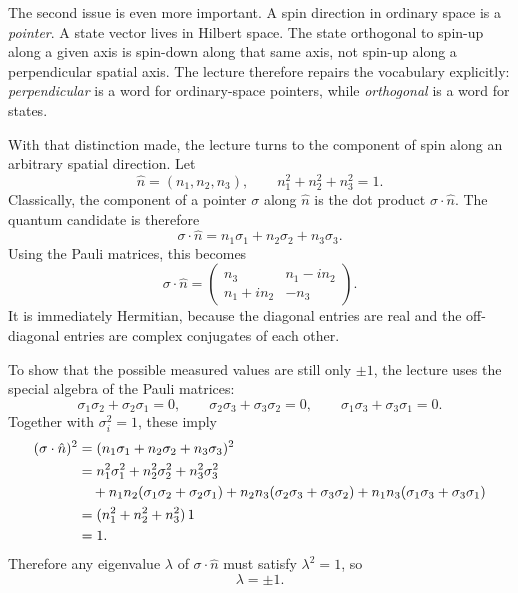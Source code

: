 The second issue is even more important. A spin direction in ordinary space is a \emph{pointer}. A state vector lives in Hilbert space. The state orthogonal to spin-up along a given axis is spin-down along that same axis, not spin-up along a perpendicular spatial axis. The lecture therefore repairs the vocabulary explicitly: \emph{perpendicular} is a word for ordinary-space pointers, while \emph{orthogonal} is a word for states.

With that distinction made, the lecture turns to the component of spin along an arbitrary spatial direction. Let
\begin{equation}
\hat n=(n_1,n_2,n_3),
\qquad
n_1^2+n_2^2+n_3^2=1.
\end{equation}
Classically, the component of a pointer \(\sigma\) along \(\hat n\) is the dot product \(\sigma\cdot \hat n\). The quantum candidate is therefore
\begin{equation}
\sigma\cdot \hat n=n_1\sigma_1+n_2\sigma_2+n_3\sigma_3.
\end{equation}
Using the Pauli matrices, this becomes
\begin{equation}
\sigma\cdot \hat n=
\begin{pmatrix}
n_3 & n_1-in_2\\
n_1+in_2 & -n_3
\end{pmatrix}.
\end{equation}
It is immediately Hermitian, because the diagonal entries are real and the off-diagonal entries are complex conjugates of each other.

To show that the possible measured values are still only \(\pm1\), the lecture uses the special algebra of the Pauli matrices:
\begin{equation}
\sigma_1\sigma_2+\sigma_2\sigma_1=0,
\qquad
\sigma_2\sigma_3+\sigma_3\sigma_2=0,
\qquad
\sigma_1\sigma_3+\sigma_3\sigma_1=0.
\end{equation}
Together with \(\sigma_i^2=1\), these imply
\begin{align}
(\sigma\cdot \hat n)^2
&=
(n_1\sigma_1+n_2\sigma_2+n_3\sigma_3)^2\\
&=
n_1^2\sigma_1^2+n_2^2\sigma_2^2+n_3^2\sigma_3^2 \notag\\
&\quad
+n_1n_2(\sigma_1\sigma_2+\sigma_2\sigma_1)
+n_2n_3(\sigma_2\sigma_3+\sigma_3\sigma_2)
+n_1n_3(\sigma_1\sigma_3+\sigma_3\sigma_1) \notag\\
&=
(n_1^2+n_2^2+n_3^2)\,1\\
&=1. \notag
\end{align}
Therefore any eigenvalue \(\lambda\) of \(\sigma\cdot \hat n\) must satisfy \(\lambda^2=1\), so
\begin{equation}
\lambda=\pm1.
\end{equation}

